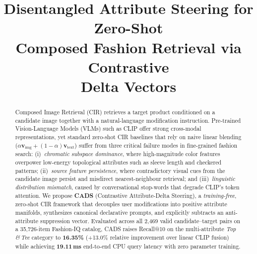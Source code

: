 \documentclass[conference]{IEEEtran}
\begin{document}
\title{Disentangled Attribute Steering for Zero-Shot\\Composed Fashion Retrieval via Contrastive\\Delta Vectors}

\author{
}

\maketitle

\begin{abstract}
Composed Image Retrieval (CIR) retrieves a target product conditioned on a candidate image together with a natural-language modification instruction. Pre-trained Vision-Language Models (VLMs) such as CLIP offer strong cross-modal representations, yet standard zero-shot CIR baselines that rely on naive linear blending ($\alpha\mathbf{v}_{\text{img}}+(1{-}\alpha)\mathbf{v}_{\text{text}}$) suffer from three critical failure modes in fine-grained fashion search: (i)~\emph{chromatic subspace dominance}, where high-magnitude color features overpower low-energy topological attributes such as sleeve length and checkered patterns; (ii)~\emph{source feature persistence}, where contradictory visual cues from the candidate image persist and misdirect nearest-neighbour retrieval; and (iii)~\emph{linguistic distribution mismatch}, caused by conversational stop-words that degrade CLIP's token attention. We propose \textbf{CADS} (Contrastive Attribute-Delta Steering), a \emph{training-free}, zero-shot CIR framework that decouples user modifications into positive attribute manifolds, synthesizes canonical declarative prompts, and explicitly subtracts an anti-attribute suppression vector. Evaluated across all 2{,}469 valid candidate--target pairs on a 35{,}726-item Fashion-IQ catalog, CADS raises Recall@10 on the multi-attribute \textit{Top\,\&\,Tee} category to \textbf{16.35\%} (+13.0\% relative improvement over linear CLIP fusion) while achieving \textbf{19.11\,ms} end-to-end CPU query latency with zero parameter training.
\end{abstract}
\end{document}
